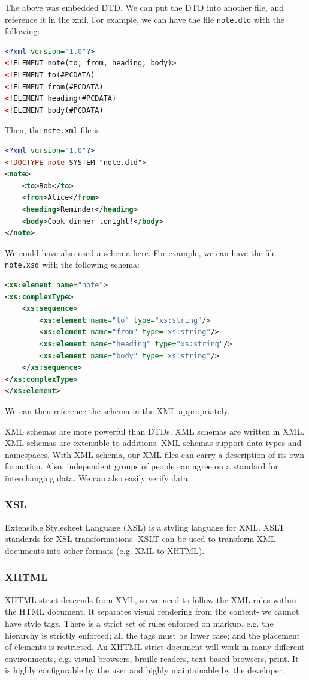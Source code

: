 \documentclass[a4paper, openany]{memoir}
\begin{document}
The above was embedded DTD. We can put the DTD into another file, and reference it in the xml. For example, we can have the file \texttt{note.dtd} with the following:
\begin{lstlisting}[language=xml]
<?xml version="1.0"?>
<!ELEMENT note(to, from, heading, body)>
<!ELEMENT to(#PCDATA)
<!ELEMENT from(#PCDATA)
<!ELEMENT heading(#PCDATA)
<!ELEMENT body(#PCDATA)
\end{lstlisting}
Then, the \texttt{note.xml} file is:
\begin{lstlisting}[language=xml]
<?xml version="1.0"?>
<!DOCTYPE note SYSTEM "note.dtd">
<note>
    <to>Bob</to>
    <from>Alice</from>
    <heading>Reminder</heading>
    <body>Cook dinner tonight!</body>
</note>
\end{lstlisting}
We could have also used a schema here. For example, we can have the file \texttt{note.xsd} with the following schema:
\begin{lstlisting}[language=xml]
<xs:element name="note">
<xs:complexType>
    <xs:sequence>
        <xs:element name="to" type="xs:string"/>
        <xs:element name="from" type="xs:string"/>
        <xs:element name="heading" type="xs:string"/>
        <xs:element name="body" type="xs:string"/>
    </xs:sequence>
</xs:complexType>
</xs:element>
\end{lstlisting}
We can then reference the schema in the XML appropriately.

XML schemas are more powerful than DTDs. XML schemas are written in XML. XML schemas are extensible to additions. XML schemas support data types and namespaces. With XML schema, our XML files can carry a description of its own formation. Also, independent groups of people can agree on a standard for interchanging data. We can also easily verify data.

\subsubsection{XSL}
Extensible Stylesheet Language (XSL) is a styling language for XML. XSLT standards for XSL transformations. XSLT can be used to transform XML documents into other formats (e.g. XML to XHTML). 

\subsubsection{XHTML}
XHTML strict descends from XML, so we need to follow the XML rules within the HTML document. It separates visual rendering from the content- we cannot have style tags. There is a strict set of rules enforced on markup, e.g. the hierarchy is strictly enforced; all the tags must be lower case; and the placement of elements is restricted. An XHTML strict document will work in many different environments, e.g. visual browsers, braille readers, text-based browsers, print. It is highly configurable by the user and highly maintainable by the developer.
\end{document}
